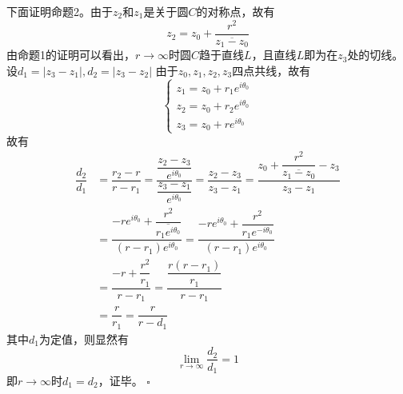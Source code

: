 \documentclass{article}
\newenvironment{SOLUTION}[1][{}]{{\noindent\heiti 解#1：}}{\hfill $\square$\par}
\begin{document}
\begin{SOLUTION}[法1]
    下面证明命题2。由于$z_2$和$z_1$是关于圆$C$的对称点，故有
    \begin{equation}
    z_2=z_0+\frac{r^2}{\overline{z_1-z_0}}
    \end{equation}
    由命题1的证明可以看出，$r\rightarrow\infty$时圆$C$趋于直线$L$，且直线$L$即为在$z_3$处的切线。设$d_1=|z_3-z_1|,d_2=|z_3-z_2|$
    由于$z_0,z_1,z_2,z_3$四点共线，故有
    \begin{equation}
    \begin{cases}
    z_1=z_0+r_1e^{i\theta_0}\\
    z_2=z_0+r_2e^{i\theta_0}\\
    z_3=z_0+re^{i\theta_0}
    \end{cases}
    \end{equation}
    故有
    \newcommand{\ei}{e^{i\theta_0}}
    \begin{equation}
    \begin{split}
    \dfrac{d_2}{d_1}&=\dfrac{r_2-r}{r-r_1}=\dfrac{\dfrac{z_2-z_3}{e^{i\theta_0}}}{\dfrac{z_3-z_1}{e^{i\theta_0}}}=\dfrac{z_2-z_3}{z_3-z_1}=\dfrac{z_0+\dfrac{r^2}{\overline{z_1-z_0}}-z_3}{z_3-z_1}\\
    &=\dfrac{-r\ei+\dfrac{r^2}{\overline{r_1\ei}}}{(r-r_1)\ei}=\dfrac{-r\ei+\dfrac{r^2}{r_1e^{-i\theta_0}}}{(r-r_1)\ei}\\
    &=\dfrac{-r+\dfrac{r^2}{r_1}}{r-r_1}=\dfrac{\dfrac{r(r-r_1)}{r_1}}{r-r_1}\\
    &=\dfrac{r}{r_1}=\dfrac{r}{r-d_1}
    \end{split}
    \end{equation}
    其中$d_1$为定值，则显然有
    \begin{equation}
    \lim_{r\rightarrow\infty} \dfrac{d_2}{d_1}=1
    \end{equation}
    即$r\rightarrow\infty$时$d_1=d_2$，证毕。
    \end{SOLUTION}
\end{document}
